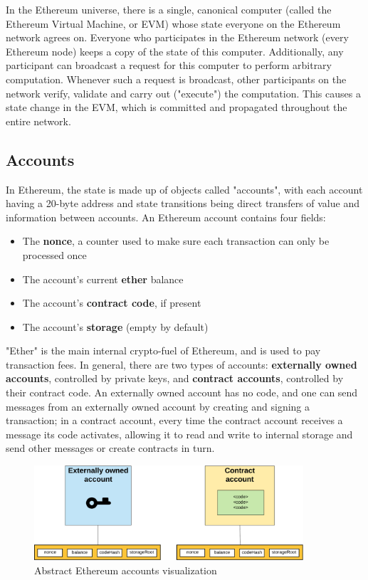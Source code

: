 In the Ethereum universe, there is a single, canonical computer (called the Ethereum Virtual Machine, or \acrshort{EVM}) whose state everyone on the Ethereum network agrees on. Everyone who participates in the Ethereum network (every Ethereum node) keeps a copy of the state of this computer. Additionally, any participant can broadcast a request for this computer to perform arbitrary computation. Whenever such a request is broadcast, other participants on the network verify, validate and carry out ("execute") the computation. This causes a state change in the EVM, which is committed and propagated throughout the entire network.\cite{ethereumcommunityEthereumDevelopmentDocumentation}

\subsection{Accounts}
In Ethereum, the state is made up of objects called "accounts", with each account having a 20-byte address and state transitions being direct transfers of value and information between accounts. An Ethereum account contains four fields:

\begin{itemize}
\item The \textbf{nonce}, a counter used to make sure each transaction can only be processed once
\item The account's current \textbf{ether} balance
\item The account's \textbf{contract code}, if present
\item The account's \textbf{storage} (empty by default)
\end{itemize}

"Ether" is the main internal crypto-fuel of Ethereum, and is used to pay transaction fees. In general, there are two types of accounts: \textbf{externally owned accounts}, controlled by private keys, and \textbf{contract accounts}, controlled by their contract code. An externally owned account has no code, and one can send messages from an externally owned account by creating and signing a transaction; in a contract account, every time the contract account receives a message its code activates, allowing it to read and write to internal storage and send other messages or create contracts in turn\cite{buterinvitalikEthereumWhitePaper2013}.\newpage

\begin{figure}[h]
	\centering
		\includegraphics[width=10cm]{images/chapter2/accounts.png}
		\caption{{\footnotesize Abstract Ethereum accounts visualization}}
\end{figure}

